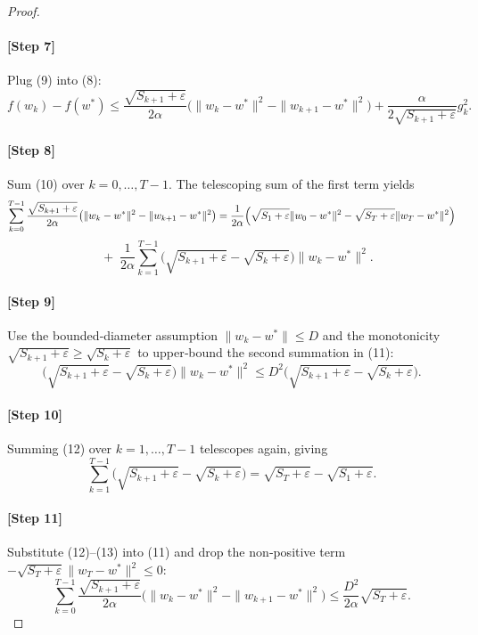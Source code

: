 \documentclass{article}
\begin{document}
\begin{proof}
\paragraph{[Step 7]} Plug (9) into (8):
\[
f(w_{k})-f(w^{*})
   \le \frac{\sqrt{S_{k+1}+\varepsilon}}{2\alpha}
        \bigl(\|w_{k}-w^{*}\|^{2}
        -\|w_{k+1}-w^{*}\|^{2}\bigr)
        +\frac{\alpha}{2\sqrt{S_{k+1}+\varepsilon}}g_{k}^{2}.
\tag{10}
\]

\paragraph{[Step 8]} Sum (10) over $k=0,\dots,T-1$.
The telescoping sum of the first term yields
\[
\sum_{k=0}^{T-1}\frac{\sqrt{S_{k+1}+\varepsilon}}{2\alpha}
        \bigl(\|w_{k}-w^{*}\|^{2}
        -\|w_{k+1}-w^{*}\|^{2}\bigr)
   =\frac{1}{2\alpha}
        \Bigl(\sqrt{S_{1}+\varepsilon}\|w_{0}-w^{*}\|^{2}
              -\sqrt{S_{T}+\varepsilon}\|w_{T}-w^{*}\|^{2}\Bigr)
\]
\[
\;\;\;+\;\frac{1}{2\alpha}\sum_{k=1}^{T-1}
        \bigl(\sqrt{S_{k+1}+\varepsilon}-\sqrt{S_{k}+\varepsilon}\bigr)
        \|w_{k}-w^{*}\|^{2}.
\tag{11}
\]

\paragraph{[Step 9]} Use the bounded‑diameter assumption $\|w_{k}-w^{*}\|\le D$ and the monotonicity
$\sqrt{S_{k+1}+\varepsilon}\ge\sqrt{S_{k}+\varepsilon}$ to upper‑bound the second summation in (11):
\[
\bigl(\sqrt{S_{k+1}+\varepsilon}-\sqrt{S_{k}+\varepsilon}\bigr)
        \|w_{k}-w^{*}\|^{2}
   \le D^{2}\bigl(\sqrt{S_{k+1}+\varepsilon}-\sqrt{S_{k}+\varepsilon}\bigr).
\tag{12}
\]

\paragraph{[Step 10]} Summing (12) over $k=1,\dots,T-1$ telescopes again, giving
\[
\sum_{k=1}^{T-1}
        \bigl(\sqrt{S_{k+1}+\varepsilon}-\sqrt{S_{k}+\varepsilon}\bigr)
   =\sqrt{S_{T}+\varepsilon}-\sqrt{S_{1}+\varepsilon}.
\tag{13}
\]

\paragraph{[Step 11]} Substitute (12)–(13) into (11) and drop the non‑positive term
$-\sqrt{S_{T}+\varepsilon}\|w_{T}-w^{*}\|^{2}\le0$:
\[
\sum_{k=0}^{T-1}\frac{\sqrt{S_{k+1}+\varepsilon}}{2\alpha}
        \bigl(\|w_{k}-w^{*}\|^{2}
        -\|w_{k+1}-w^{*}\|^{2}\bigr)
   \le \frac{D^{2}}{2\alpha}\sqrt{S_{T}+\varepsilon}.
\tag{14}
\]


\end{proof}
\end{document}
